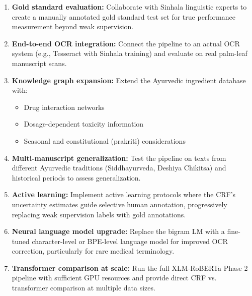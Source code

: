 \documentclass[12pt, a4paper, twoside]{report}
\begin{document}
\begin{enumerate}
    \item \textbf{Gold standard evaluation:} Collaborate with Sinhala linguistic experts to create a manually annotated gold standard test set for true performance measurement beyond weak supervision.
    
    \item \textbf{End-to-end OCR integration:} Connect the pipeline to an actual OCR system (e.g., Tesseract with Sinhala training) and evaluate on real palm-leaf manuscript scans.
    
    \item \textbf{Knowledge graph expansion:} Extend the Ayurvedic ingredient database with:
    \begin{itemize}
        \item Drug interaction networks
        \item Dosage-dependent toxicity information
        \item Seasonal and constitutional (prakriti) considerations
    \end{itemize}
    
    \item \textbf{Multi-manuscript generalization:} Test the pipeline on texts from different Ayurvedic traditions (Siddhayurveda, Deshiya Chikitsa) and historical periods to assess generalization.
    
    \item \textbf{Active learning:} Implement active learning protocols where the CRF's uncertainty estimates guide selective human annotation, progressively replacing weak supervision labels with gold annotations.
    
    \item \textbf{Neural language model upgrade:} Replace the bigram LM with a fine-tuned character-level or BPE-level language model for improved OCR correction, particularly for rare medical terminology.
    
    \item \textbf{Transformer comparison at scale:} Run the full XLM-RoBERTa Phase 2 pipeline with sufficient GPU resources and provide direct CRF vs. transformer comparison at multiple data sizes.
\end{enumerate}



\end{document}
